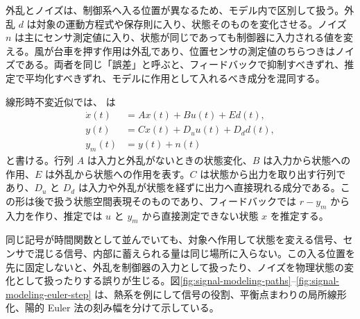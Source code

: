 外乱とノイズは、制御系へ入る位置が異なるため、モデル内で区別して扱う。外乱 $d$ は対象の運動方程式や保存則に入り、状態そのものを変化させる。ノイズ $n$ は主にセンサ測定値に入り、状態が同じであっても制御器に入力される値を変える。風が台車を押す作用は外乱であり、位置センサの測定値のちらつきはノイズである。両者を同じ「誤差」と呼ぶと、フィードバックで抑制すべきずれ、推定で平均化すべきずれ、モデルに作用として入れるべき成分を混同する。

線形時不変近似では、 は
\begin{align}
  \dot{x}(t)&=Ax(t)+Bu(t)+Ed(t),\label{eq:lti-disturbance-model}\\
  y(t)&=Cx(t)+D_u u(t)+D_d d(t),\\
  y_m(t)&=y(t)+n(t)
\end{align}
と書ける。行列 $A$ は入力と外乱がないときの状態変化、$B$ は入力から状態への作用、$E$ は外乱から状態への作用を表す。$C$ は状態から出力を取り出す行列であり、$D_u$ と $D_d$ は入力や外乱が状態を経ずに出力へ直接現れる成分である。この形は後で扱う状態空間表現そのものであり、フィードバックでは $r-y_m$ から入力を作り、推定では $u$ と $y_m$ から直接測定できない状態 $x$ を推定する。

同じ記号が時間関数として並んでいても、対象へ作用して状態を変える信号、センサで混じる信号、内部に蓄えられる量は同じ場所に入らない。この入る位置を先に固定しないと、外乱を制御器の入力として扱ったり、ノイズを物理状態の変化として扱ったりする誤りが生じる。図\ref{fig:signal-modeling-paths}--\ref{fig:signal-modeling-euler-step} は、熱系を例にして信号の役割、平衡点まわりの局所線形化、陽的 Euler 法の刻み幅を分けて示している。

